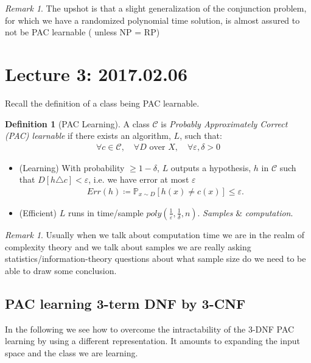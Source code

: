 \documentclass[12pt, letterpaper]{article}
\numberwithin{equation}{section} %
\newcommand{\mb}{\mathbb}
\newcommand{\mc}{\mathcal}
\newcommand{\ve}{\varepsilon}
\theoremstyle{definition}
\newtheorem{definition}[theorem]{Definition}
\theoremstyle{remark}
\newtheorem{remark}[theorem]{Remark}
\begin{document}
\begin{remark}
    The upshot is that a slight generalization of the conjunction problem, for which we have a randomized polynomial time solution, is almost assured to not be PAC learnable ( unless NP = RP)
\end{remark}




\section{Lecture 3: 2017.02.06}

Recall the definition of a class being PAC learnable.
\begin{definition}[PAC Learning]
	A class $\mc C$ is \emph{Probably Approximately Correct (PAC) learnable} if there exists an algorithm, $L$, such that:
	\begin{align}
    	\forall c \in \mc C,\quad \forall D \textrm{ over }X,\quad \forall \ve,\delta > 0
	\end{align} 
	\begin{itemize}
		\item (Learning) With probability $\geq 1 -\delta$, $L$ outputs a hypothesis, $h$ in $\mc 
		C$ such that $D[h\triangle c]<\ve$, i.e. we have error at most $\ve$
		\begin{align}
    		Err(h) \coloneqq \mb P_{x\sim D}[h(x) \ne c(x)] \leq \ve.
		\end{align}
		\item (Efficient) $L$ runs in time/sample $poly\left(\frac1\ve, \frac1\delta, n\right)$. \emph{Samples} \& \emph{computation}.
	\end{itemize}
\end{definition}
\begin{remark}
    Usually when we talk about computation time we are in the realm of complexity theory and we talk about samples we are really asking statistics/information-theory questions about what sample size do we need to be able to draw some conclusion.
\end{remark}

\subsection{PAC learning 3-term DNF by 3-CNF}
In the following we see how to overcome the intractability of the 3-DNF PAC learning by using a different representation. It amounts to expanding the input space and the class we are learning.
\end{document}
